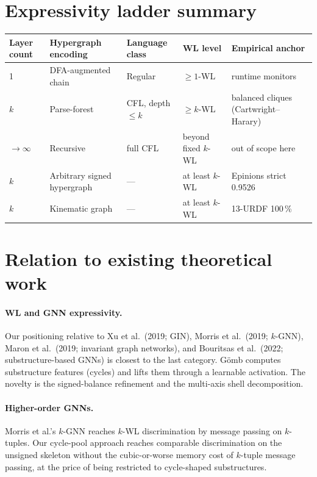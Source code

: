 \documentclass[11pt,a4paper]{article}
\newcommand{\WL}{\textsf{WL}}
\newcommand{\Gomb}{G\"omb}
\begin{document}
\section{Expressivity ladder summary}

\begin{table}[h]
\centering
\begin{tabular}{lllll}
\toprule
Layer count & Hypergraph encoding & Language class & WL level & Empirical anchor \\
\midrule
1           & DFA-augmented chain  & Regular        & $\geq 1$-\WL  & runtime monitors \\
$k$         & Parse-forest         & CFL, depth $\leq k$ & $\geq k$-\WL & balanced cliques (Cartwright--Harary) \\
$\to \infty$ & Recursive            & full CFL       & beyond fixed $k$-\WL & out of scope here \\
$k$         & Arbitrary signed hypergraph & --- & at least $k$-\WL & Epinions strict 0.9526 \\
$k$         & Kinematic graph      & --- & at least $k$-\WL & 13-URDF 100\,\% \\
\bottomrule
\end{tabular}
\end{table}

\section{Relation to existing theoretical work}

\paragraph{WL and GNN expressivity.}
Our positioning relative to Xu et al.\ (2019; GIN), Morris et al.\
(2019; $k$-GNN), Maron et al.\ (2019; invariant graph networks),
and Bouritsas et al.\ (2022; substructure-based GNNs) is closest to
the last category. \Gomb{} computes substructure features (cycles)
and lifts them through a learnable activation. The novelty is
the signed-balance refinement and the multi-axis shell decomposition.

\paragraph{Higher-order GNNs.}
Morris et al.'s $k$-GNN reaches $k$-\WL{} discrimination by message
passing on $k$-tuples. Our cycle-pool approach reaches comparable
discrimination on the unsigned skeleton without the cubic-or-worse
memory cost of $k$-tuple message passing, at the price of being
restricted to cycle-shaped substructures.
\end{document}
